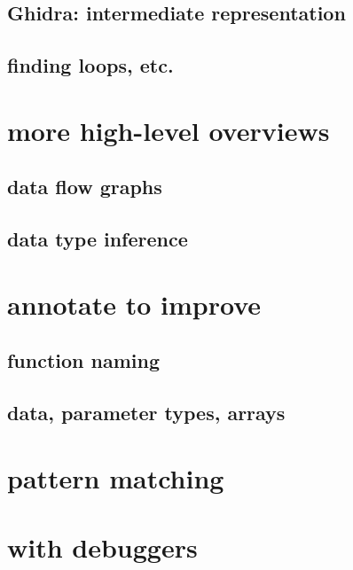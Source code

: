 \subsection{Ghidra: intermediate representation}

\subsection{finding loops, etc.}


\section{more high-level overviews}

\subsection{data flow graphs}

\subsection{data type inference}

\section{annotate to improve}

\subsection{function naming}

\subsection{data, parameter types, arrays}

\section{pattern matching}

\section{with debuggers}


